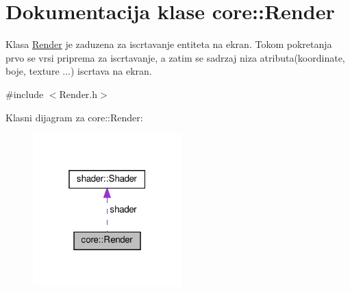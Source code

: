 \hypertarget{classcore_1_1Render}{}\section{Dokumentacija klase core\+:\+:Render}
\label{classcore_1_1Render}


Klasa \hyperlink{classcore_1_1Render}{Render} je zaduzena za iscrtavanje entiteta na ekran. Tokom pokretanja prvo se vrsi priprema za iscrtavanje, a zatim se sadrzaj niza atributa(koordinate, boje, texture ...) iscrtava na ekran.  




{\ttfamily \#include $<$Render.\+h$>$}



Klasni dijagram za core\+:\+:Render\+:\nopagebreak
\begin{figure}[H]
\begin{center}
\leavevmode
\includegraphics[width=163pt]{classcore_1_1Render__coll__graph}
\end{center}
\end{figure}
